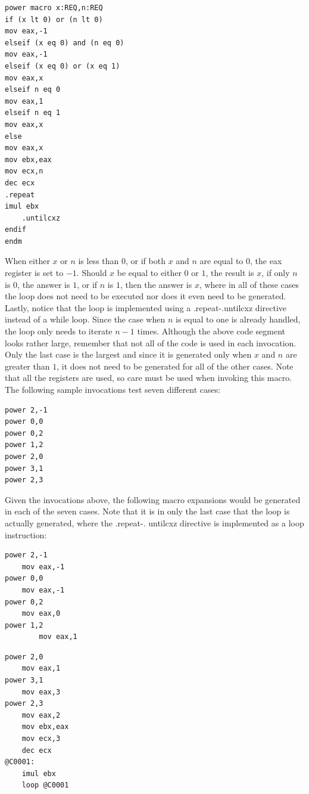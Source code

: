 \documentclass[10pt]{book}
\begin{document}
\begin{verbatim}
power macro x:REQ,n:REQ
if (x lt 0) or (n lt 0)
mov eax,-1
elseif (x eq 0) and (n eq 0)
mov eax,-1
elseif (x eq 0) or (x eq 1)
mov eax,x
elseif n eq 0
mov eax,1
elseif n eq 1
mov eax,x
else
mov eax,x
mov ebx,eax
mov ecx,n
dec ecx
.repeat
imul ebx
    .untilcxz
endif
endm
\end{verbatim}

When either $x$ or $n$ is less than $0$, or if both $x$ and $n$ are equal to $0$, the eax register is set to $-1$. Should $x$ be equal to either $0$ or $1$, the result is $x$, if only $n$ is $0$, the answer is $1$, or if $n$ is $1$, then the answer is $x$, where in all of these cases the loop does not need to be executed nor does it even need to be generated. Lastly, notice that the loop is implemented using a .repeat-.untilcxz directive instead of a while loop. Since the case when $n$ is equal to one is already handled, the loop only needs to iterate $n-1$ times. Although the above code segment looks rather large, remember that not all of the code is used in each invocation. Only the last case is the largest and since it is generated only when $x$ and $n$ are greater than $1$, it does not need to be generated for all of the other cases. Note that all the registers are used, so care must be used when invoking this macro. The following sample invocations test seven different cases:
\begin{verbatim}
power 2,-1
power 0,0
power 0,2
power 1,2
power 2,0
power 3,1
power 2,3
\end{verbatim}

Given the invocations above, the following macro expansions would be generated in each of the seven cases. Note that it is in only the last case that the loop is actually generated, where the .repeat-. untilcxz directive is implemented as a loop instruction:

\begin{verbatim}
power 2,-1
    mov eax,-1
power 0,0
    mov eax,-1
power 0,2
    mov eax,0
power 1,2
        mov eax,1
\end{verbatim}

\begin{verbatim}
power 2,0
    mov eax,1
power 3,1
    mov eax,3
power 2,3
    mov eax,2
    mov ebx,eax
    mov ecx,3
    dec ecx
@C0001:
    imul ebx
    loop @C0001
\end{verbatim}
\end{document}
